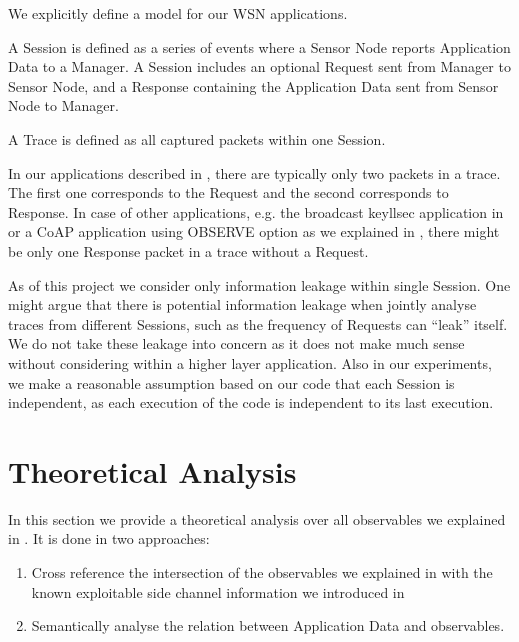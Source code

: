 We explicitly define a model for our WSN applications.

\begin{definition} \label{Def: Session}
A Session is defined as a series of events where a Sensor Node reports Application Data to a Manager. A Session includes an optional Request sent from Manager to Sensor Node, and a Response containing the Application Data sent from Sensor Node to Manager.
\end{definition}

\begin{definition} \label{Def: Trace}
A Trace is defined as all captured packets within one Session.
\end{definition}

In our applications described in , there are typically only two packets in a trace. The first one corresponds to the Request and the second corresponds to Response. In case of other applications, e.g. the broadcast keyllsec application in  or a CoAP application using OBSERVE option as we explained in , there might be only one Response packet in a trace without a Request.

As of this project we consider only information leakage within single Session. One might argue that there is potential information leakage when jointly analyse traces from different Sessions, such as the frequency of Requests can ``leak'' itself. We do not take these leakage into concern as it does not make much sense without considering within a higher layer application. Also in our experiments, we make a reasonable assumption based on our code that each Session is independent, as each execution of the code is independent to its last execution.


\section{Theoretical Analysis}

In this section we provide a theoretical analysis over all observables we explained in . It is done in two approaches:

\begin{enumerate}
	\item Cross reference the intersection of the observables we explained in  with the known exploitable side channel information we introduced in 
	\item Semantically analyse the relation between Application Data and observables. 
\end{enumerate}

